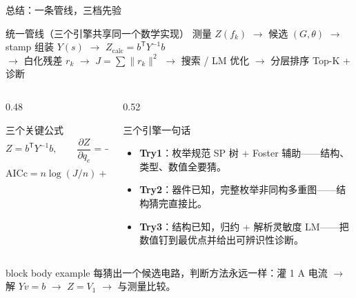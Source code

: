 \documentclass[UTF8,aspectratio=169,10pt]{ctexbeamer}
\begin{document}
\begin{frame}{总结：一条管线，三档先验}
  \begin{block}{统一管线（三个引擎共享同一个数学实现）}
    \centering\footnotesize
    测量 $Z(f_k)$ $\to$ 候选 $(G,\theta)$ $\to$ stamp 组装 $Y(s)$ $\to$ $Z_{\mathrm{calc}}=b^{\mathsf T}Y^{-1}b$\\[1pt]
    $\to$ 白化残差 $r_k$ $\to$ $J=\sum\|r_k\|^2$ $\to$ 搜索 / LM 优化 $\to$ 分层排序 Top-K + 诊断
  \end{block}
  \begin{columns}
    \begin{column}{0.48\textwidth}
      \begin{block}{三个关键公式}
        \[
          Z=b^{\mathsf T}Y^{-1}b,\qquad
          \frac{\partial Z}{\partial q_e}=-\frac{\partial y_e}{\partial q_e}(V_u-V_v)^2
        \]
        \[
          \mathrm{AICc}=n\log(J/n)+2k+\frac{2k(k+1)}{n-k-1}
        \]
      \end{block}
    \end{column}
    \begin{column}{0.52\textwidth}
      \begin{block}{三个引擎一句话}
        \begin{itemize}
          \item \textbf{Try1}：枚举规范 SP 树 + Foster 辅助——结构、类型、数值全要猜。
          \item \textbf{Try2}：器件已知，完整枚举非同构多重图——结构猜完直接比。
          \item \textbf{Try3}：结构已知，归约 + 解析灵敏度 LM——把数值钉到最优点并给出可辨识性诊断。
        \end{itemize}
      \end{block}
    \end{column}
  \end{columns}
  \begin{center}
    \begin{beamercolorbox}[center,sep=4pt]{block body example}
      \footnotesize 每猜出一个候选电路，判断方法永远一样：灌 1 A 电流 $\to$ 解 $Yv=b$ $\to$ $Z=V_1$ $\to$ 与测量比较。
    \end{beamercolorbox}
  \end{center}
\end{frame}
\end{document}
